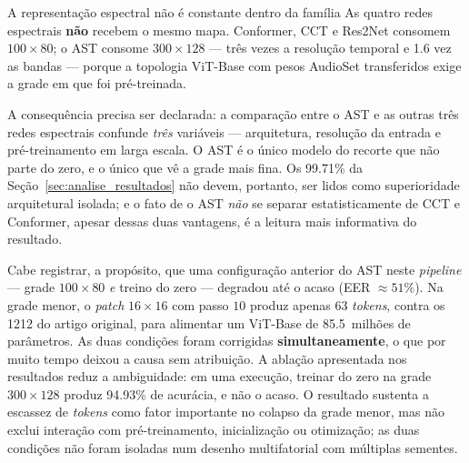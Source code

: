 \documentclass[12pt,a4paper]{article}
\begin{document}
\begin{warningbox}{A representação espectral não é constante dentro da família}
	As quatro redes espectrais \textbf{não} recebem o mesmo mapa. Conformer, CCT e
	Res2Net consomem $100 \times 80$; o AST consome $300 \times 128$ --- três vezes
	a resolução temporal e \num{1,6} vez as bandas --- porque a topologia ViT-Base
	com pesos AudioSet transferidos exige a grade em que foi pré-treinada.
	
	A consequência precisa ser declarada: a comparação entre o AST e as outras três
	redes espectrais confunde \emph{três} variáveis --- arquitetura, resolução da
	entrada e pré-treinamento em larga escala. O AST é o único modelo do recorte
	que não parte do zero, e o único que vê a grade mais fina. Os \num{99,71}\% da
	Seção~\ref{sec:analise_resultados} não devem, portanto, ser lidos como
	superioridade arquitetural isolada; e o fato de o AST \emph{não} se separar
	estatisticamente de CCT e Conformer, apesar dessas duas vantagens, é a leitura
	mais informativa do resultado.
	
	Cabe registrar, a propósito, que uma configuração anterior do AST neste
	\textit{pipeline} --- grade $100 \times 80$ \emph{e} treino do zero --- degradou
	até o acaso (EER $\approx \num{51}\%$). Na grade menor, o \textit{patch}
	$16 \times 16$ com passo $10$ produz apenas \num{63} \textit{tokens}, contra os
	\num{1212} do artigo original, para alimentar um ViT-Base de
	\num{85,5}~milhões de parâmetros. As duas condições foram corrigidas
	\textbf{simultaneamente}, o que por muito tempo deixou a causa sem atribuição.
	A ablação apresentada nos resultados reduz a ambiguidade: em uma execução,
	treinar do zero na grade $300 \times 128$ produz \num{94,93}\% de acurácia, e
	não o acaso. O resultado sustenta a escassez de \textit{tokens} como fator
	importante no colapso da grade menor, mas não exclui interação com
	pré-treinamento, inicialização ou otimização; as duas condições não foram
	isoladas num desenho multifatorial com múltiplas sementes.
\end{warningbox}
\end{document}
